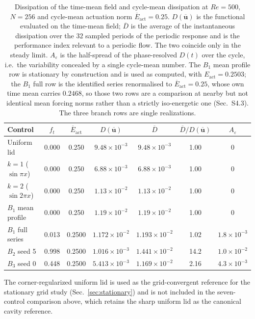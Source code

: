 \documentclass[11pt,a4paper]{article}
\newcommand{\Dbar}{\overline{D}}
\newenvironment{chgadd}{\par\color{blue}}{\par\color{black}}
\begin{document}
\begin{chgadd}
\begin{table}[t]
\centering
\caption{Dissipation of the time-mean field and cycle-mean dissipation at
$Re=500$, $N=256$ and cycle-mean actuation norm $\overline{E}_{\mathrm{act}}=0.25$.
$D(\overline{\mathbf{u}})$ is the functional evaluated on the time-mean field;
$\Dbar$ is the average of the instantaneous dissipation over the $32$ sampled
periods of the periodic response and is the performance index relevant to a
periodic flow. The two coincide only in the steady limit. $A_\varepsilon$ is the
half-spread of the phase-resolved $D(t)$ over the cycle, i.e.\ the variability
concealed by a single cycle-mean number. The $B_1$ mean profile row is stationary
by construction and is used as computed, with $E_{\mathrm{act}}=0.2503$; the $B_1$
full row is the identified series renormalised to $\overline{E}_{\mathrm{act}}=0.25$,
whose own time mean carries $0.2468$, so those two rows are a comparison at
nearby but not identical mean forcing norms rather than a strictly iso-energetic one
(Sec.~S4.3). The three branch
rows are single realizations.}
\label{tab:cycle}
\small
\begin{tabular}{lcccccc}
\toprule
Control & $f_t$ & $\overline{E}_{\mathrm{act}}$ & $D(\overline{\mathbf{u}})$ & $\Dbar$
& $\Dbar/D(\overline{\mathbf{u}})$ & $A_\varepsilon$\\
\midrule
Uniform lid & 0.000 & 0.250 & $9.48\times10^{-3}$ & $9.48\times10^{-3}$ & 1.00 & $0$\\
$k=1$ ($\sin\pi x$) & 0.000 & 0.250 & $6.88\times10^{-3}$ & $6.88\times10^{-3}$ & 1.00 & $0$\\
$k=2$ ($\sin 2\pi x$) & 0.000 & 0.250 & $1.13\times10^{-2}$ & $1.13\times10^{-2}$ & 1.00 & $0$\\
$B_1$ mean profile & 0.000 & 0.250 & $1.19\times10^{-2}$ & $1.19\times10^{-2}$ & 1.00 & $0$\\
$B_1$ full series & 0.013 & 0.2500 & $1.172\times10^{-2}$ & $1.193\times10^{-2}$ & 1.02 & $1.8\times10^{-3}$\\
$B_2$ seed 5 & 0.998 & 0.2500 & $1.016\times10^{-3}$ & $1.441\times10^{-2}$ & 14.2 & $1.0\times10^{-2}$\\
$B_3$ seed 0 & 0.448 & 0.2500 & $5.413\times10^{-3}$ & $1.169\times10^{-2}$ & 2.16 & $4.3\times10^{-3}$\\
\bottomrule
\end{tabular}
\end{table}

The corner-regularized uniform lid is used as the grid-convergent reference for the
stationary grid study (Sec.~\ref{sec:stationary}) and is not included
in the seven-control comparison above, which retains the sharp uniform lid as the
canonical cavity reference.


\end{chgadd}
\end{document}
